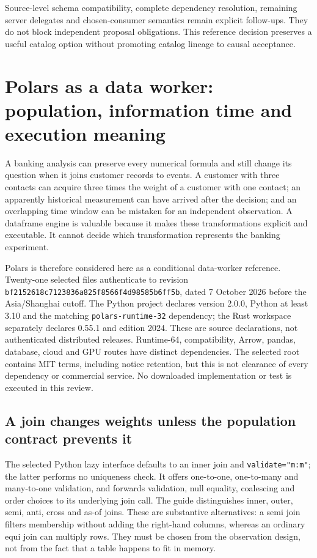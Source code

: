 Source-level schema compatibility, complete dependency resolution, remaining
server delegates and chosen-consumer semantics remain explicit follow-ups.
They do not block independent proposal obligations. This reference decision
preserves a useful catalog option without promoting catalog lineage to causal
acceptance.


\section{Polars as a data worker: population, information time and execution meaning}
\label{sec:exec23-polars-worker}

A banking analysis can preserve every numerical formula and still change its
question when it joins customer records to events. A customer with three
contacts can acquire three times the weight of a customer with one contact;
an apparently historical measurement can have arrived after the decision;
and an overlapping time window can be mistaken for an independent
observation. A dataframe engine is valuable because it makes these
transformations explicit and executable. It cannot decide which
transformation represents the banking experiment.

Polars is therefore considered here as a conditional data-worker reference.
Twenty-one selected files authenticate to revision
\texttt{bf2152618c7123836a825f8566f4d98585b6ff5b}, dated 7 October 2026 before
the Asia/Shanghai cutoff. The Python project declares version 2.0.0,
Python at least 3.10 and the matching \texttt{polars-runtime-32} dependency;
the Rust workspace separately declares 0.55.1 and edition 2024. These are
source declarations, not authenticated distributed releases. Runtime-64,
compatibility, Arrow, pandas, database, cloud and GPU routes have distinct
dependencies. The selected root contains MIT terms, including notice
retention, but this is not clearance of every dependency or commercial
service. No downloaded implementation or test is executed in this review.
\citep{exec23_polars_sources}

\subsection{A join changes weights unless the population contract prevents it}

The selected Python lazy interface defaults to an inner join and
\texttt{validate="m:m"}; the latter performs no uniqueness check. It offers
one-to-one, one-to-many and many-to-one validation, and forwards validation,
null equality, coalescing and order choices to its underlying join call.
The guide distinguishes inner, outer, semi, anti, cross and as-of joins.
These are substantive alternatives: a semi join filters membership without
adding the right-hand columns, whereas an ordinary equi join can multiply
rows. They must be chosen from the observation design, not from the fact
that a table happens to fit in memory.~\citep{exec23_polars_sources}

